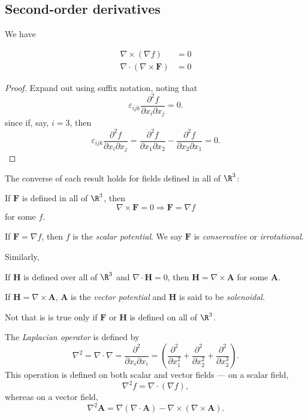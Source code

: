 \documentclass[a4paper]{article}
\begin{document}
\subsection{Second-order derivatives}
We have
\begin{prop}
  \begin{align*}
    \nabla\times (\nabla f) &= 0\\
    \nabla\cdot (\nabla\times \mathbf{F}) &=0
  \end{align*}
\end{prop}

\begin{proof}
  Expand out using suffix notation, noting that
  \[
    \varepsilon_{ijk}\frac{\partial^2 f}{\partial x_i \partial x_j} = 0.
  \]
  since if, say, $i = 3$, then
  \[
    \varepsilon_{ijk}\frac{\partial^2 f}{\partial x_i \partial x_j} = \frac{\partial^2 f}{\partial x_1 \partial x_2} - \frac{\partial^2 f}{\partial x_2 \partial x_1} = 0.
  \]

\end{proof}

The converse of each result holds for fields defined in all of $\R^3$:
\begin{prop}
  If $\mathbf{F}$ is defined in all of $\R^3$, then
  \[
    \nabla\times \mathbf{F} = 0 \Rightarrow  \mathbf{F} = \nabla f
  \]
  for some $f$.
\end{prop}

\begin{defi}
  If $\mathbf{F} = \nabla f$, then $f$ is the \emph{scalar potential}. We say $\mathbf{F}$ is \emph{conservative} or \emph{irrotational}.
\end{defi}
Similarly,
\begin{prop}
  If $\mathbf{H}$ is defined over all of $\R^3$ and $\nabla\cdot \mathbf{H} = 0$, then $\mathbf{H} = \nabla \times \mathbf{A}$ for some $\mathbf{A}$.
\end{prop}

\begin{defi}
  If $\mathbf{H} = \nabla \times \mathbf{A}$, $\mathbf{A}$ is the \emph{vector potential} and $\mathbf{H}$ is said to be \emph{solenoidal}.
\end{defi}

Not that is is true only if $\mathbf{F}$ or $\mathbf{H}$ is defined on all of $\R^3$.

\begin{defi}
  The \emph{Laplacian operator} is defined by
  \[
    \nabla^2 = \nabla\cdot \nabla = \frac{\partial^2}{\partial x_i \partial x_i} = \left(\frac{\partial^2}{\partial x_1^2} + \frac{\partial^2}{\partial x_2^2} + \frac{\partial^2}{\partial x_3^3}\right).
  \]
  This operation is defined on both scalar and vector fields --- on a scalar field,
  \[
    \nabla^2 f = \nabla\cdot (\nabla f),
  \]
  whereas on a vector field,
  \[
    \nabla^2 \mathbf{A} = \nabla(\nabla\cdot \mathbf{A}) - \nabla\times (\nabla\times \mathbf{A}).
  \]
\end{defi}
\end{document}
